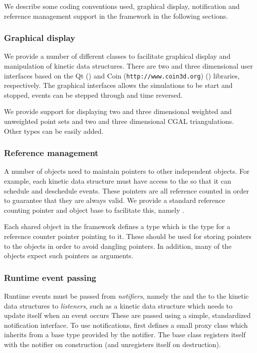 We describe some coding conventions used, graphical display,
notification and reference management support in the framework in the
following sections.


\subsubsection{Graphical display}

We provide a number of different classes to facilitate graphical
display and manipulation of kinetic data structures. There are two and
three dimensional user interfaces based on the Qt
() and Coin (\texttt{http://www.coin3d.org})
() libraries,
respectively.  The graphical interfaces allows the simulations to be
start and stopped, events can be stepped through and time reversed.

We provide support for displaying two and three dimensional weighted
and unweighted point sets and two and three dimensional CGAL
triangulations. Other types can be easily added.

\subsubsection{Reference management}

A number of objects need to maintain pointers to other independent
objects. For example, each kinetic data structure must have access to
the  so that it can schedule and deschedule events. These
pointers are all reference counted in order to guarantee that they are
always valid. We provide a standard reference counting pointer and
object base to facilitate this, namely .

Each shared object in the framework defines a type  which is the
type for a reference counter pointer pointing to it. These should be
used for storing pointers to the objects in order to avoid dangling
pointers. In addition, many of the objects expect such pointers as
arguments.

\subsubsection{Runtime event passing}

Runtime events must be passed from \textit{notifiers}, namely the
 and the  to the kinetic data
structures to \textit{listeners}, such as a kinetic data structure
which needs to update itself when an event occurs These are passed
using a simple, standardized notification interface. To use
notifications, first defines a small proxy class which inherits from a
 base type provided by the notifier. The 
base class registers itself with the notifier on construction (and
unregisters itself on destruction).

